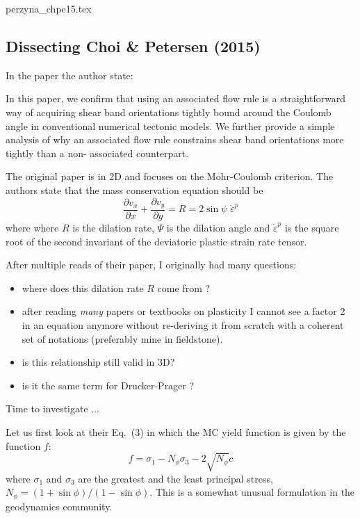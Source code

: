 \begin{flushright} {\tiny {\color{gray} perzyna\_chpe15.tex}} \end{flushright}

\subsection{Dissecting Choi \& Petersen (2015)}

In the paper the author state:
\begin{displayquote}
{\color{darkgray}
In this paper, we conﬁrm that using an associated ﬂow rule is a
straightforward way of acquiring shear band orientations tightly
bound around the Coulomb angle in conventional numerical tectonic
models. We further provide a simple analysis of why an associated
ﬂow rule constrains shear band orientations more tightly than a non-
associated counterpart.}
\end{displayquote}


The original paper \cite{chpe15} is in 2D and focuses on the Mohr-Coulomb criterion. 
The authors state that the mass conservation equation should be 
\[
\frac{\partial v_x}{\partial x}
+
\frac{\partial v_y}{\partial y}
=
R=2 \sin \psi \; \dot{\varepsilon}^p
\]
where where $R$ is the dilation rate, $\Psi$ is the dilation angle and
$\dot{\varepsilon}^p$ is the square root of the second invariant of the deviatoric plastic strain rate tensor.

After multiple reads of their paper, I originally had many questions:
\begin{itemize}
\item where does this dilation rate $R$ come from ? 
\item after reading \textit{many} papers or textbooks on plasticity 
I cannot see a factor 2 in an equation anymore without re-deriving 
it from scratch with a coherent set of notations (preferably mine in fieldstone). 
\item is this relationship still valid in 3D?
\item is it the same term for Drucker-Prager ?
\end{itemize}
Time to investigate ...
\vspace{1cm}

Let us first look at their Eq.~(3)  in which  
the MC yield function is given by the function $f$:
\[
f = \sigma_1 - N_\phi \sigma_3 - 2 \sqrt{N_\phi} c 
\]
where $\sigma_1$ and $\sigma_3$ are the greatest and the least principal stress, $N_\phi=(1+\sin \phi)/(1-\sin \phi)$.
This is a somewhat unusual formulation in the geodynamics community.

